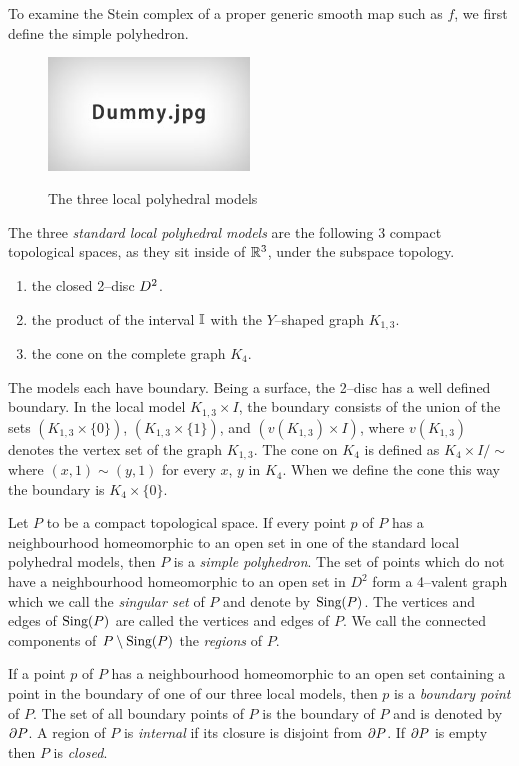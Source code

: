 To examine the Stein complex of a proper generic smooth map such as $f$, we first define the simple polyhedron.

\begin{defn}
	\begin{figure}
		\centering
		\caption{The three local polyhedral models}
		\includegraphics[height=3cm]{figures/dummy.jpg}
		\label{fig:localpoly}
	\end{figure}
	The three \emph{standard local polyhedral models} are the following 3 compact topological spaces, as they sit inside of $\mathbb{R}^3$, under the subspace topology.
	\begin{enumerate}
		\item the closed 2--disc $D^2$.
		\item the product of the interval $\mathbb{I}$ with the $Y$--shaped graph $K_{1,3}$.
		\item the cone on the complete graph $K_4$.
	\end{enumerate}
	The models each have boundary.
	Being a surface, the 2--disc has a well defined boundary.
	In the local model $K_{1,3}\times I$, the boundary consists of the union of the sets $(K_{1,3}\times \{0\})$, $(K_{1,3}\times \{1\})$, and $(v(K_{1,3})\times I)$, where $v(K_{1,3})$ denotes the vertex set of the graph $K_{1,3}$.
	The cone on $K_4$ is defined as $K_4\times I /\sim$ where $(x,1)\sim (y,1)$ for every $x$, $y$ in $K_4$.
	When we define the cone this way the boundary is $K_4\times \{0\}$.
\end{defn}

\begin{defn}
	Let $P$ to be a compact topological space.	
	If every point $p$ of $P$ has a neighbourhood homeomorphic to an open set in one of the standard local polyhedral models, then $P$ is a \emph{simple polyhedron}.
	The set of points which do not have a neighbourhood homeomorphic to an open set in $D^2$ form a 4--valent graph which we call the \emph{singular set} of $P$ and denote by $\textrm{Sing} (P)$.
	The vertices and edges of $\textrm{Sing} (P)$ are called the vertices and edges of $P$.
	We call the connected components of $P\setminus\textrm{Sing} (P)$ the \emph{regions} of $P$.
	
	
	If a point $p$ of $P$ has a neighbourhood homeomorphic to an open set containing a point in the boundary of one of our three local models, then $p$ is a \emph{boundary point} of $P$.
	The set of all boundary points of $P$ is the boundary of $P$ and is denoted by $\partial P$.
	A region of $P$ is \emph{internal} if its closure is disjoint from $\partial P$.
	If $\partial P$ is empty then $P$ is \emph{closed}.
\end{defn}

